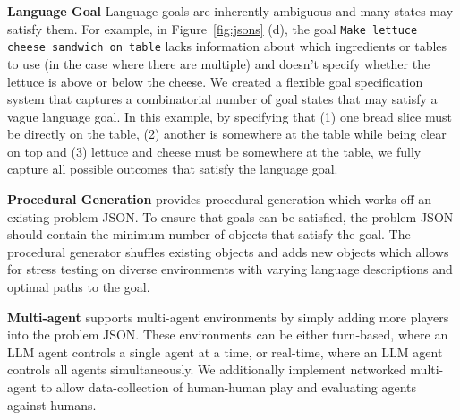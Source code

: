 \textbf{Language Goal} Language goals are inherently ambiguous and many states may satisfy them. For example, in Figure~\ref{fig:jsons} (d), the goal \texttt{Make lettuce cheese sandwich on table} lacks information about which ingredients or tables to use (in the case where there are multiple) and doesn't specify whether the lettuce is above or below the cheese. We created a flexible goal specification system that captures a combinatorial number of goal states that may satisfy a vague language goal. In this example, by specifying that (1) one bread slice must be directly on the table, (2) another is somewhere at the table while being clear on top and (3) lettuce and cheese must be somewhere at the table, we fully capture all possible outcomes that satisfy the language goal.



\textbf{Procedural Generation} \robotouille{} provides procedural generation which works off an existing problem JSON. To ensure that goals can be satisfied, the problem JSON should contain the minimum number of objects that satisfy the goal. The procedural generator shuffles existing objects and adds new objects which allows for stress testing on diverse environments with varying language descriptions and optimal paths to the goal.



\textbf{Multi-agent} \robotouille{} supports multi-agent environments by simply adding more players into the problem JSON. These environments can be either turn-based, where an LLM agent controls a single agent at a time, or real-time, where an LLM agent controls all agents simultaneously. We additionally implement networked multi-agent to allow data-collection of human-human play and evaluating agents against humans.

\vspace{-0.5em}

\vspace{-0.5em}